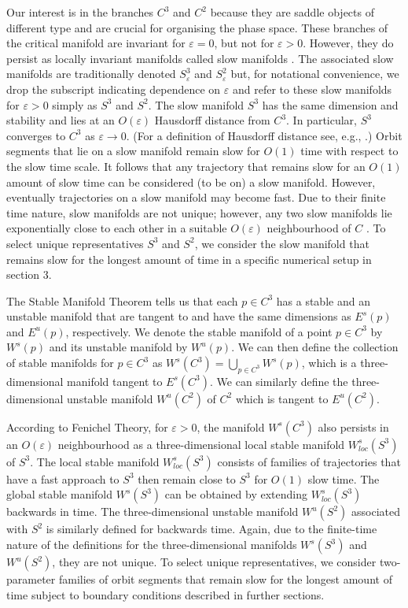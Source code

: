 \documentclass{ws-ijbc}
\begin{document}
Our interest is in the branches $C^3$ and $C^2$ because they are saddle objects of different type and are crucial for organising the phase space.  These branches of the critical manifold are invariant for $\varepsilon = 0$, but not for $\varepsilon > 0$.  However, they do persist as locally invariant manifolds called slow manifolds \cite{Fenichel}.  The associated slow manifolds are traditionally denoted $S^3_\varepsilon$ and $S^2_\varepsilon$ but, for notational convenience, we drop the subscript indicating dependence on $\varepsilon$ and refer to these slow manifolds for $\varepsilon > 0$ simply as $S^3$ and $S^2$.  The slow manifold $S^3$ has the same dimension and stability and lies at an $O(\varepsilon)$ Hausdorff distance from $C^3$.  In particular, $S^3$ converges to $C^3$ as $\varepsilon \rightarrow 0$.  (For a definition of Hausdorff distance see, e.g., \cite{Hausdorff_Distance}.)  Orbit segments that lie on a slow manifold remain slow for $O(1)$ time with respect to the slow time scale.  It follows that any trajectory that remains slow for an $O(1)$ amount of slow time can be considered (to be on) a slow manifold.  However, eventually trajectories on a slow manifold may become fast. Due to their finite time nature, slow manifolds are not unique; however, any two slow manifolds lie exponentially close to each other in a suitable $O(\varepsilon)$ neighbourhood of $C$ \cite{Fenichel}.  To select unique representatives $S^3$ and $S^2$, we consider the slow manifold that remains slow for the longest amount of time in a specific numerical setup in section 3.

The Stable Manifold Theorem tells us that each $p \in C^3$ has a stable and an unstable manifold that are tangent to and have the same dimensions as $E^{s}(p)$ and $E^{u}(p)$, respectively.  We denote the stable manifold of a point $p \in C^3$ by $W^{s}(p)$ and its unstable manifold by $W^{u}(p)$.  We can then define the collection of stable manifolds for $p \in C^3$ as $W^{s}(C^3) = \bigcup_{p \in C^3} W^{s}(p)$, which is a three-dimensional manifold tangent to $E^s(C^3)$.  We can similarly define the three-dimensional unstable manifold $W^{u}(C^2)$ of $C^2$ which is tangent to $E^u(C^2)$.

According to Fenichel Theory, for $\varepsilon > 0$, the manifold $W^{s}(C^3)$ also persists in an $O(\varepsilon)$ neighbourhood as a three-dimensional local stable manifold $W^{s}_{loc}(S^3)$ of $S^3$.  The local stable manifold $W^{s}_{loc}(S^3)$ consists of families of trajectories that have a fast approach to $S^3$ then remain close to $S^3$ for $O(1)$ slow time.  The global stable manifold $W^{s}(S^3)$ can be obtained by extending $W^{s}_{loc}(S^3)$ backwards in time.  The three-dimensional unstable manifold $W^{u}(S^2)$ associated with $S^2$ is similarly defined for backwards time.  Again, due to the finite-time nature of the definitions for the three-dimensional manifolds $W^{s}(S^3)$ and $W^{u}(S^2)$, they are not unique.  To select unique representatives, we consider two-parameter families of orbit segments that remain slow for the longest amount of time subject to boundary conditions described in further sections.  
 
\end{document}
